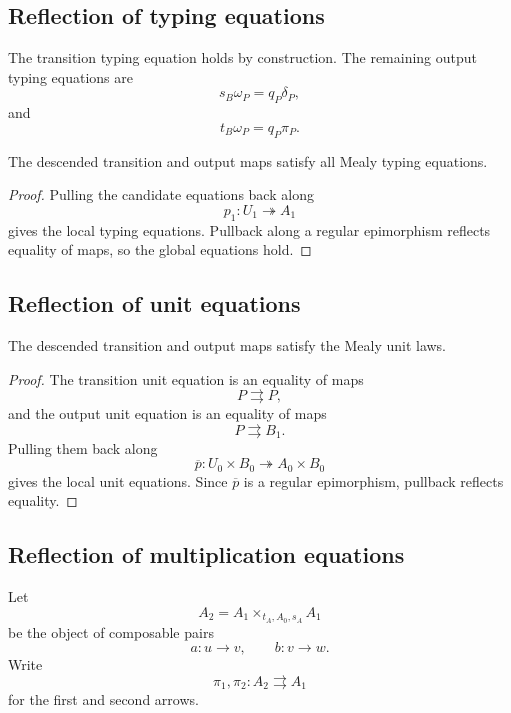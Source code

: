 \subsection{Reflection of typing equations}
\label{subsec:reflection-typing-equations}

The transition typing equation holds by construction. The remaining output
typing equations are
\[
    s_B\omega_P
    =
    q_P\delta_P,
\]
and
\[
    t_B\omega_P
    =
    q_P\pi_P.
\]

\begin{proposition}
\label{prop:descent-typing-equations}
The descended transition and output maps satisfy all Mealy typing equations.
\end{proposition}

\begin{proof}
Pulling the candidate equations back along
\[
    p_1:U_1\twoheadrightarrow A_1
\]
gives the local typing equations. Pullback along a regular epimorphism reflects
equality of maps, so the global equations hold.
\end{proof}

\subsection{Reflection of unit equations}
\label{subsec:reflection-unit-equations}

\begin{proposition}
\label{prop:descent-unit-equations}
The descended transition and output maps satisfy the Mealy unit laws.
\end{proposition}

\begin{proof}
The transition unit equation is an equality of maps
\[
    P\rightrightarrows P,
\]
and the output unit equation is an equality of maps
\[
    P\rightrightarrows B_1.
\]
Pulling them back along
\[
    \overline p:
    U_0\times B_0
    \twoheadrightarrow
    A_0\times B_0
\]
gives the local unit equations. Since \(\overline p\) is a regular
epimorphism, pullback reflects equality.
\end{proof}

\subsection{Reflection of multiplication equations}
\label{subsec:reflection-multiplication-equations}

Let
\[
    A_2
    =
    A_1\times_{t_A,A_0,s_A}A_1
\]
be the object of composable pairs
\[
    a:u\to v,
    \qquad
    b:v\to w.
\]
Write
\[
    \pi_1,\pi_2:
    A_2\rightrightarrows A_1
\]
for the first and second arrows.

